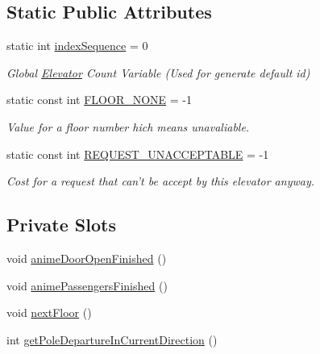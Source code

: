 \subsection*{Static Public Attributes}
\begin{DoxyCompactItemize}
\item 
\hypertarget{class_elevator_a457c6551bbec5edc5051c381ed8cb037}{
static int \hyperlink{class_elevator_a457c6551bbec5edc5051c381ed8cb037}{indexSequence} = 0}
\label{class_elevator_a457c6551bbec5edc5051c381ed8cb037}

\begin{DoxyCompactList}\small\item\em Global \hyperlink{class_elevator}{Elevator} Count Variable (Used for generate default id) \end{DoxyCompactList}\item 
\hypertarget{class_elevator_a0e992da73960fcb066c4216d48828348}{
static const int \hyperlink{class_elevator_a0e992da73960fcb066c4216d48828348}{FLOOR\_\-NONE} = -\/1}
\label{class_elevator_a0e992da73960fcb066c4216d48828348}

\begin{DoxyCompactList}\small\item\em Value for a floor number hich means unavaliable. \end{DoxyCompactList}\item 
\hypertarget{class_elevator_aea037729441aae59042ce4f5b9b3adf7}{
static const int \hyperlink{class_elevator_aea037729441aae59042ce4f5b9b3adf7}{REQUEST\_\-UNACCEPTABLE} = -\/1}
\label{class_elevator_aea037729441aae59042ce4f5b9b3adf7}

\begin{DoxyCompactList}\small\item\em Cost for a request that can't be accept by this elevator anyway. \end{DoxyCompactList}\end{DoxyCompactItemize}
\subsection*{Private Slots}
\begin{DoxyCompactItemize}
\item 
void \hyperlink{class_elevator_a1c7640e845ad36870c764f87e53d21e2}{animeDoorOpenFinished} ()
\item 
void \hyperlink{class_elevator_ad0d2554d24ea14d07afa2a7e5d00725a}{animePassengersFinished} ()
\item 
void \hyperlink{class_elevator_a5d4ecef44a3e87b14b5ce8de10008fdd}{nextFloor} ()
\item 
int \hyperlink{class_elevator_abd54853d9aba7177792df167c0bb894c}{getPoleDepartureInCurrentDirection} ()
\end{DoxyCompactItemize}
